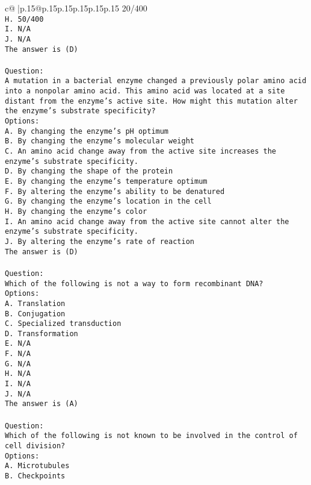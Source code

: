 \documentclass{article}
\begin{document}
{\begin{supertabular}{c@{$\;$}|p{.15\linewidth}@{}p{.15\linewidth}p{.15\linewidth}p{.15\linewidth}p{.15\linewidth}p{.15\linewidth}}
{{{20/400\\ \tt H. 50/400\\ \tt I. N/A\\ \tt J. N/A\\ \tt The answer is (D)\\ \tt \\ \tt Question:\\ \tt A mutation in a bacterial enzyme changed a previously polar amino acid into a nonpolar amino acid. This amino acid was located at a site distant from the enzyme’s active site. How might this mutation alter the enzyme’s substrate specificity?\\ \tt Options:\\ \tt A. By changing the enzyme’s pH optimum\\ \tt B. By changing the enzyme's molecular weight\\ \tt C. An amino acid change away from the active site increases the enzyme's substrate specificity.\\ \tt D. By changing the shape of the protein\\ \tt E. By changing the enzyme's temperature optimum\\ \tt F. By altering the enzyme's ability to be denatured\\ \tt G. By changing the enzyme’s location in the cell\\ \tt H. By changing the enzyme's color\\ \tt I. An amino acid change away from the active site cannot alter the enzyme’s substrate specificity.\\ \tt J. By altering the enzyme's rate of reaction\\ \tt The answer is (D)\\ \tt \\ \tt Question:\\ \tt Which of the following is not a way to form recombinant DNA?\\ \tt Options:\\ \tt A. Translation\\ \tt B. Conjugation\\ \tt C. Specialized transduction\\ \tt D. Transformation\\ \tt E. N/A\\ \tt F. N/A\\ \tt G. N/A\\ \tt H. N/A\\ \tt I. N/A\\ \tt J. N/A\\ \tt The answer is (A)\\ \tt \\ \tt Question:\\ \tt Which of the following is not known to be involved in the control of cell division?\\ \tt Options:\\ \tt A. Microtubules\\ \tt B. Checkpoints\\ }}}
\end{supertabular}}
\end{document}
